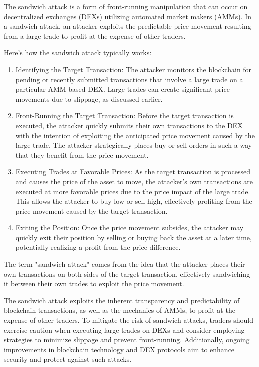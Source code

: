 \begin{ex}\label{ex:sandwich_attack}
The sandwich attack is a form of front-running manipulation that can occur on decentralized exchanges (DEXs) utilizing automated market makers (AMMs). In a sandwich attack, an attacker exploits the predictable price movement resulting from a large trade to profit at the expense of other traders.

Here's how the sandwich attack typically works:
\begin{enumerate}
\item Identifying the Target Transaction: The attacker monitors the blockchain for pending or recently submitted transactions that involve a large trade on a particular AMM-based DEX. Large trades can create significant price movements due to slippage, as discussed earlier.
\item Front-Running the Target Transaction: Before the target transaction is executed, the attacker quickly submits their own transactions to the DEX with the intention of exploiting the anticipated price movement caused by the large trade. The attacker strategically places buy or sell orders in such a way that they benefit from the price movement.
\item Executing Trades at Favorable Prices: As the target transaction is processed and causes the price of the asset to move, the attacker's own transactions are executed at more favorable prices due to the price impact of the large trade. This allows the attacker to buy low or sell high, effectively profiting from the price movement caused by the target transaction.
\item Exiting the Position: Once the price movement subsides, the attacker may quickly exit their position by selling or buying back the asset at a later time, potentially realizing a profit from the price difference.

\end{enumerate}
The term "sandwich attack" comes from the idea that the attacker places their own transactions on both sides of the target transaction, effectively sandwiching it between their own trades to exploit the price movement.

The sandwich attack exploits the inherent transparency and predictability of blockchain transactions, as well as the mechanics of AMMs, to profit at the expense of other traders. To mitigate the risk of sandwich attacks, traders should exercise caution when executing large trades on DEXs and consider employing strategies to minimize slippage and prevent front-running. Additionally, ongoing improvements in blockchain technology and DEX protocols aim to enhance security and protect against such attacks.
\end{ex}

